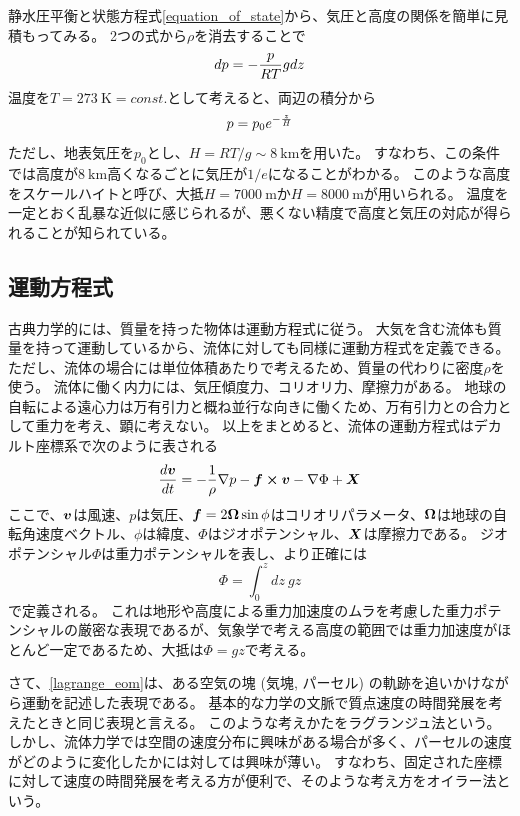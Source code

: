 \documentclass[a4paper,11pt,platex]{jsarticle}
\numberwithin{equation}{section}
\begin{document}
静水圧平衡と状態方程式\autoref{equation_of_state}から、気圧と高度の関係を簡単に見積もってみる。
2つの式から$\rho$を消去することで
\begin{equation}
    dp = -{p \over RT} g dz
\end{equation}
温度を$T=273 \: \mathrm{K} = const.$として考えると、両辺の積分から
\begin{equation}
    p = p_0e^{-{z \over H}}
\end{equation}
ただし、地表気圧を$p_0$とし、$H=RT/g\sim 8 \:\mathrm{km}$を用いた。
すなわち、この条件では高度が$8 \:\mathrm{km}$高くなるごとに気圧が$1/e$になることがわかる。
このような高度をスケールハイトと呼び、大抵$H=7000 \: \mathrm{m}$か$H=8000 \: \mathrm{m}$が用いられる。
温度を一定とおく乱暴な近似に感じられるが、悪くない精度で高度と気圧の対応が得られることが知られている。


\subsection{運動方程式}
古典力学的には、質量を持った物体は運動方程式に従う。
大気を含む流体も質量を持って運動しているから、流体に対しても同様に運動方程式を定義できる。
ただし、流体の場合には単位体積あたりで考えるため、質量の代わりに密度$\rho$を使う。
流体に働く内力には、気圧傾度力、コリオリ力、摩擦力がある。
地球の自転による遠心力は万有引力と概ね並行な向きに働くため、万有引力との合力として重力を考え、顕に考えない。
以上をまとめると、流体の運動方程式はデカルト座標系で次のように表される
\begin{equation}
    \label{lagrange_eom}
    {d\vb*{v} \over dt} = -{1 \over \rho} \nabla p - \vb*{f} \cross \vb*{v} - \nabla \Phi + \vb*{X}
\end{equation}
ここで、$\vb*{v}$は風速、$p$は気圧、$\vb*{f}=2\vb*{\Omega}\sin{\phi}$はコリオリパラメータ、$\vb*{\Omega}$は地球の自転角速度ベクトル、$\phi$は緯度、$\Phi$はジオポテンシャル、$\vb*{X}$は摩擦力である。
ジオポテンシャル$\Phi$は重力ポテンシャルを表し、より正確には
\begin{equation}
    \Phi = \int^{z}_{0} dz \: gz
\end{equation}
で定義される。
これは地形や高度による重力加速度のムラを考慮した重力ポテンシャルの厳密な表現であるが、気象学で考える高度の範囲では重力加速度がほとんど一定であるため、大抵は$\Phi=gz$で考える。

さて、\autoref{lagrange_eom}は、ある空気の塊 (気塊, パーセル) の軌跡を追いかけながら運動を記述した表現である。
基本的な力学の文脈で質点速度の時間発展を考えたときと同じ表現と言える。
このような考えかたをラグランジュ法という。
しかし、流体力学では空間の速度分布に興味がある場合が多く、パーセルの速度がどのように変化したかには対しては興味が薄い。
すなわち、固定された座標に対して速度の時間発展を考える方が便利で、そのような考え方をオイラー法という。
\end{document}
